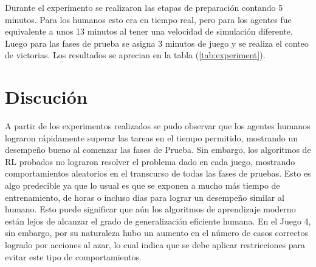 Durante el experimento se realizaron las etapas de preparación contando 5 minutos. Para los humanos esto era en tiempo real, pero para los agentes fue equivalente a unos 13 minutos al tener una velocidad de simulación diferente. Luego para las fases de prueba se asigna 3 minutos de juego y se realiza el conteo de victorias. Los resultados se aprecian en la tabla (\ref{tab:experiment}).
 
\begin{table}[ht!]
    \centering
    \caption{Resultado del experimento en la fase de Prueba. Total de juegos completados correctamente durante 3 minutos.}
    \label{tab:experiment}
\end{table}
 
\section{Discución}
 
A partir de los experimentos realizados se pudo observar que los agentes humanos lograron rápidamente superar las tareas en el tiempo permitido, mostrando un desempeño bueno al comenzar las fases de Prueba. Sin embargo, los algoritmos de RL probados no lograron resolver el problema dado en cada juego, mostrando comportamientos aleatorios en el transcurso de todas las fases de pruebas. Esto es algo predecible ya que lo usual es que se exponen a mucho más tiempo de entrenamiento, de horas o incluso días para lograr un desempeño similar al humano. Esto puede significar que aún los algoritmos de aprendizaje moderno están lejos de alcanzar el grado de generalización eficiente humana. En el Juego 4, sin embargo, por su naturaleza hubo un aumento en el número de casos correctos logrado por acciones al azar, lo cual indica que se debe aplicar restricciones para evitar este tipo de comportamientos.
 
 

